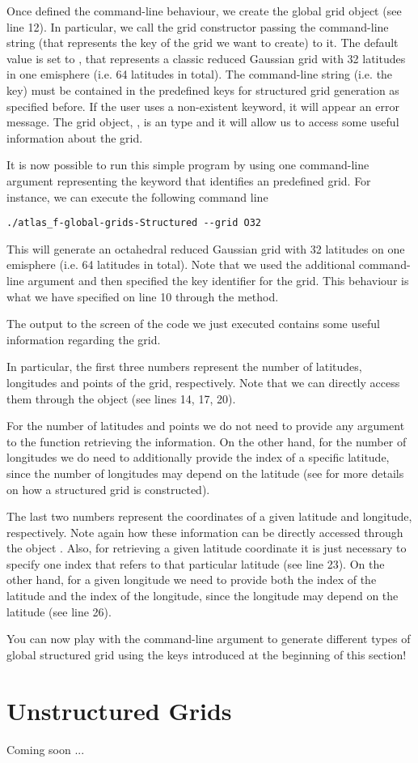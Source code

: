 %

%

Once defined the command-line behaviour, we create the global 
grid object (see line 12). In particular, we call 
the grid constructor passing the command-line string 
(that represents the key of the grid we want to create) to 
it. The default value is set to , that represents 
a classic reduced Gaussian grid with 32 latitudes in one emisphere 
(i.e. 64 latitudes in total).  
The command-line string (i.e. the key) must be contained 
in the predefined keys for structured grid generation as specified 
before. If the user uses a non-existent keyword, it will 
appear an error message.
The grid object, , is 
an  type and it will allow 
us to access some useful information about the grid.  

It is now possible to run this simple program by using 
one command-line argument representing the keyword that 
identifies an \Atlas predefined grid. For instance, we 
can execute the following command line 
%
\begin{lstlisting}[style=BashStyle]
./atlas_f-global-grids-Structured --grid O32
\end{lstlisting}
% 
This will generate an octahedral reduced Gaussian grid 
with 32 latitudes on one emisphere (i.e. 64 latitudes 
in total).
Note that we used the additional command-line argument 
 and then specified the key identifier 
for the grid. This behaviour is what we have specified 
on line 10 through the  method.

The output to the screen of the code we just executed 
contains some useful information regarding the grid.

In particular, the first three numbers represent the 
number of latitudes, longitudes and points of the grid,
respectively. Note that we can directly access them 
through the  object (see lines 14, 17, 20).
%
\begin{tipbox}
For the number of latitudes and points we do not need to provide
any argument to the function retrieving the information. On the 
other hand, for the number of longitudes we do need to additionally 
provide the index of a specific latitude, since the number of 
longitudes may depend on the latitude (see  
for more details on how a structured grid is constructed). 
\end{tipbox}
%
The last two numbers represent the coordinates of a given 
latitude and longitude, respectively. Note again how these 
information can be directly accessed through the object 
. 
Also, for retrieving a given latitude coordinate it is just 
necessary to specify one index that refers to that particular 
latitude (see line 23). On the other hand, for a given longitude 
we need to provide both the index of the latitude and the index 
of the longitude, since the longitude may depend on the latitude 
(see line 26).

You can now play with the command-line argument to generate 
different types of global structured grid using the keys introduced 
at the beginning of this section!



\section{Unstructured Grids}
Coming soon ...